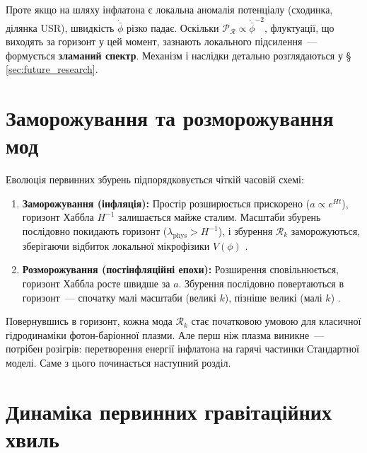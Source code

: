 Проте якщо на шляху інфлатона є локальна аномалія потенціалу
(сходинка, ділянка USR), швидкість $\dot{\bar\phi}$ різко падає.
Оскільки $\mathcal{P}_{\mathcal{R}} \propto \dot{\bar\phi}^{-2}$,
флуктуації, що виходять за горизонт у цей момент, зазнають
локального підсилення~--- формується \textbf{зламаний спектр}.
Механізм і наслідки детально розглядаються у
§\,\ref{sec:future_research}.

\section{Заморожування та розморожування мод}

Еволюція первинних збурень підпорядковується чіткій часовій
схемі:
\begin{enumerate}
  \item \textbf{Заморожування (інфляція):} Простір розширюється
        прискорено ($a \propto e^{Ht}$), горизонт Хаббла
        $H^{-1}$ залишається майже сталим. Масштаби збурень
        послідовно покидають горизонт ($\lambda_\mathrm{phys} >
        H^{-1}$), і збурення $\mathcal{R}_k$ заморожуються,
        зберігаючи відбиток локальної мікрофізики $V(\phi)$
        \cite{bardeen_1980}.
  \item \textbf{Розморожування (постінфляційні епохи):}
        Розширення сповільнюється, горизонт Хаббла росте
        швидше за $a$. Збурення послідовно повертаються в
        горизонт~--- спочатку малі масштаби (великі $k$),
        пізніше великі (малі $k$) \cite{mukhanov_2005}.
\end{enumerate}

Повернувшись в горизонт, кожна мода $\mathcal{R}_k$ стає
початковою умовою для класичної гідродинаміки фотон-баріонної
плазми. Але перш ніж плазма виникне~--- потрібен розігрів:
перетворення енергії інфлатона на гарячі частинки Стандартної
моделі. Саме з цього починається наступний розділ.

\section{Динаміка первинних гравітаційних хвиль}

